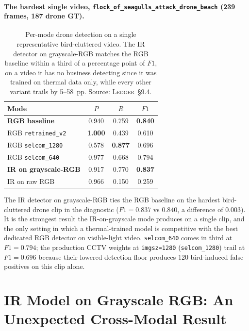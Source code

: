 \documentclass[12pt,a4paper,oneside,openright]{book}
\begin{document}
\paragraph{The hardest single video, \texttt{flock\_of\_seagulls\_attack\_drone\_beach} (239 frames, 187 drone GT).}

\begin{table}[htbp]
    \centering
    \caption{Per-mode drone detection on a single representative bird-cluttered video. The IR detector on grayscale-RGB matches the RGB baseline within a third of a percentage point of $F1$, on a video it has no business detecting since it was trained on thermal data only, while every other variant trails by 5--58~pp. Source: \textsc{Ledger}~\S9.4.}
    \label{tab:realvideo_seagull}
    \begin{tabular}{lccc}
        \toprule
        Mode & $P$ & $R$ & $F1$ \\
        \midrule
        \textbf{RGB baseline}           & 0.940 & 0.759 & \textbf{0.840} \\
        RGB \texttt{retrained\_v2} & \textbf{1.000} & 0.439 & 0.610 \\
        RGB \texttt{selcom\_1280}  & 0.578 & \textbf{0.877} & 0.696 \\
        RGB \texttt{selcom\_640}   & 0.977 & 0.668 & 0.794 \\
        \textbf{IR on grayscale-RGB} & 0.917 & 0.770 & \textbf{0.837} \\
        IR on raw RGB          & 0.966 & 0.150 & 0.259 \\
        \bottomrule
    \end{tabular}
\end{table}

\noindent The IR detector on grayscale-RGB ties the RGB baseline on the hardest bird-cluttered drone clip in the diagnostic ($F1 = 0.837$ vs $0.840$, a difference of $0.003$). It is the strongest result the IR-on-grayscale mode produces on a single clip, and the only setting in which a thermal-trained model is competitive with the best dedicated RGB detector on visible-light video. \texttt{selcom\_640} comes in third at $F1=0.794$; the production CCTV weights at \texttt{imgsz=1280} (\texttt{selcom\_1280}) trail at $F1=0.696$ because their lowered detection floor produces 120 bird-induced false positives on this clip alone.

\section{IR Model on Grayscale RGB: An Unexpected Cross-Modal Result}
\label{sec:grayscale}
\end{document}
